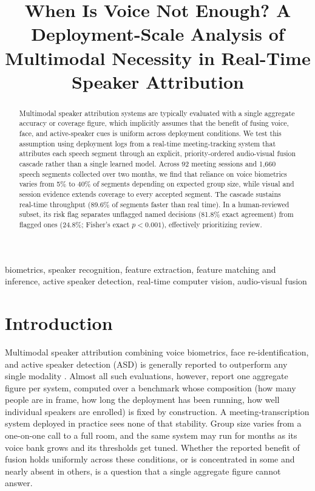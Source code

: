 \documentclass[conference]{IEEEtran}
\begin{document}
\title{When Is Voice Not Enough? A Deployment-Scale Analysis of\\
Multimodal Necessity in Real-Time Speaker Attribution}

\author{
}

\maketitle

\begin{abstract}
Multimodal speaker attribution systems are typically evaluated with a
single aggregate accuracy or coverage figure, which implicitly assumes
that the benefit of fusing voice, face, and active-speaker cues is
uniform across deployment conditions. We test this assumption using
deployment logs from a real-time meeting-tracking system that
attributes each speech segment through an explicit, priority-ordered
audio-visual fusion cascade rather than a single learned model. Across
92 meeting sessions and 1,660 speech segments
collected over two months, we find that reliance on voice biometrics
varies from 5\% to 40\% of segments depending on expected group size,
while visual and session evidence extends coverage to every accepted
segment. The cascade sustains real-time throughput (89.6\% of segments
faster than real time). In a human-reviewed subset, its risk flag
separates unflagged named decisions (81.8\% exact agreement) from
flagged ones (24.8\%; Fisher's exact $p<0.001$), effectively
prioritizing review.
\end{abstract}

\begin{IEEEkeywords}
biometrics, speaker recognition, feature extraction, feature matching and inference, active speaker detection, real-time computer vision, audio-visual fusion
\end{IEEEkeywords}

\section{Introduction}

Multimodal speaker attribution combining voice biometrics, face
re-identification, and active speaker detection (ASD) is generally
reported to outperform any single modality
\cite{chung2017lipsync,tao2021talknet,liao2023lightasd}. Almost all
such evaluations, however, report one aggregate figure per system,
computed over a benchmark whose composition (how many people are in
frame, how long the deployment has been running, how well individual
speakers are enrolled) is fixed by construction. A meeting-transcription
system deployed in practice sees none of that stability. Group size
varies from a one-on-one call to a full room, and the same system may
run for months as its voice bank grows and its thresholds get tuned. Whether the reported benefit of fusion holds uniformly
across these conditions, or is concentrated in some and nearly absent
in others, is a question that a single aggregate figure cannot answer.
\end{document}
